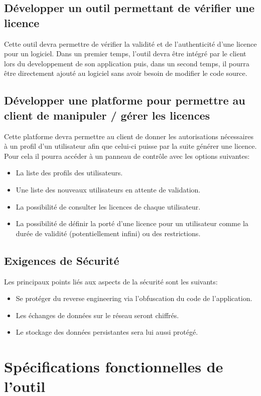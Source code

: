 \section{Développer un outil permettant de vérifier une licence}
Cette outil devra permettre de vérifier la validité et de l'authenticité d'une licence pour un logiciel. \newline
Dans un premier temps, l'outil devra être intégré par le client lors du developpement de son application 
puis, dans un second temps, il pourra être directement ajouté au logiciel sans avoir besoin de modifier le 
code source.

\section{Développer une platforme pour permettre au client de manipuler / gérer les licences}
Cette platforme devra permettre au client de donner les autorisations nécessaires à un profil d'un utilisateur afin que celui-ci puisse par la suite générer une licence. Pour cela il pourra accéder à un panneau de contrôle avec les options suivantes:
\begin{itemize}
	\item La liste des profils des utilisateurs.
	\item Une liste des nouveaux utilisateurs en attente de validation.
	\item La possibilité de consulter les licences de chaque utilisateur.
	\item La possibilité de définir la porté d'une licence pour un utilisateur 
		  comme la durée de validité (potentiellement infini) ou des restrictions.
\end{itemize}
\newpage

\section{Exigences de Sécurité}
Les principaux points liés aux aspects de la sécurité sont les suivants:
\begin{itemize}
	\item Se protéger du reverse engineering via l'obfuscation du code de l'application.
	\item Les échanges de données sur le réseau seront chiffrés.
	\item Le stockage des données persistantes sera lui aussi protégé.
\end{itemize}   

\chapter{Spécifications fonctionnelles de l'outil}

